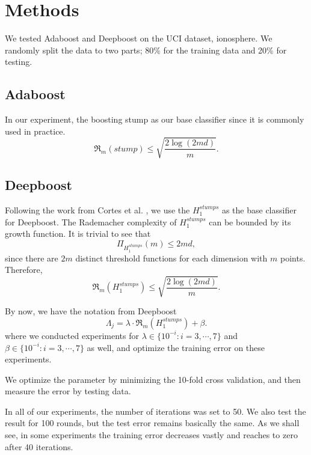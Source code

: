 \section{Methods}
We tested Adaboost and Deepboost on the UCI dataset, ionosphere\cite{Lichman2013}. We randomly split the data to two parts; 80\% for the training data and 20\% for testing.
\subsection{Adaboost}
In our experiment, the boosting stump as our base classifier since it is commonly used in practice.
\[\mathfrak{R}_m (stump)\leq \sqrt{\frac{2\log (2md)}{m}}.\]


\subsection{Deepboost}
Following the work from Cortes et al. \cite{cortes2014deep}, we use the $H_1^{stumps}$ as the base classifier for Deepboost.
The Rademacher complexity of $H_1^{stumps}$ can be bounded by its growth function.
It is trivial to see that
\[\Pi_{H_1^{stumps}}(m) \leq 2md,\]
since there are $2m$ distinct threshold functions for each dimension with $m$ points. Therefore,
\[\mathfrak{R}_m (H_1^{stumps})\leq \sqrt{\frac{2\log (2md)}{m}}.\]

By now, we have the notation from Deepboost
\[\Lambda_j=\lambda\cdot\mathfrak{R}_m (H_1^{stumps}) +\beta.\]
where we conducted experiments for $\lambda \in \{10^{-i}:i=3,\cdots, 7\}$ and $\beta \in \{10^{-i}:i=3,\cdots, 7\}$ as well, and optimize the training error on these experiments.

We optimize the parameter by minimizing the 10-fold cross validation, and then measure the error by testing data.

In all of our experiments, the number of iterations was set to 50. We also test the result for 100 rounds, but the test error remains basically the same.
As we shall see, in some experiments the training error decreases vastly and reaches to zero after 40 iterations.
